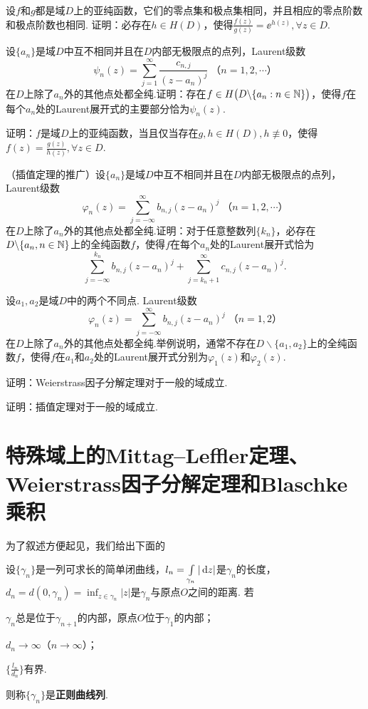 \begin{xiti}
  \item 设$f$和$g$都是域$D$上的亚纯函数，它们的零点集和极点集相同，并且相应的零点阶数和极点阶数也相同. 证明：必存在$h\in H(D)$，使得$\frac{f(z)}{g(z)}=\ee^{h(z)},\forall z\in D$.
  \item 设$\{a_n\}$是域$D$中互不相同并且在$D$内部无极限点的点列，Laurent级数
     \[
       \psi_n(z) = \sum_{j=1}^\infty\frac{c_{n,j}}{(z-a_n)^j}\;\mbox{（$n=1,2,\cdots$）}
     \]
     在$D$上除了$a_n$外的其他点处都全纯.证明：存在$f\in H\big(D\backslash
      \{a_n:n\in\mathbb N\}\big)$，使得$f$在每个$a_n$处的Laurent展开式的主要部分恰为$\psi_n(z)$.
  \item 证明：$f$是域$D$上的亚纯函数，当且仅当存在$g,h\in H(D),h\not\equiv0$，使得$f(z)=\frac{g(z)}{h(z)},\forall z\in D$.
  \item （插值定理的推广）设$\{a_n\}$是域$D$中互不相同并且在$D$内部无极限点的点列，Laurent级数
     \[
       \varphi_n(z) = \sum_{j=-\infty}^\infty b_{n,j}(z-a_n)^j\;\mbox{（$n=1,2,\cdots$）}
     \]
     在$D$上除了$a_n$外的其他点处都全纯.证明：对于任意整数列$\{k_n\}$，必存在$D\backslash
        \{a_n,n\in\mathbb N\}$上的全纯函数$f$，使得$f$在每个$a_n$处的Laurent展开式恰为
     \[
       \sum_{j=-\infty}^{k_n}b_{n,j}(z-a_n)^j+\sum_{j=k_n+1}^\infty c_{n,j}(z-a_n)^j.
     \]
  \item 设$a_1,a_2$是域$D$中的两个不同点. Laurent级数
     \[
       \varphi_n(z)=\sum_{j=-\infty}^\infty b_{n,j}(z-a_n)^j\;\mbox{（$n=1,2$）}
     \]
     在$D$上除了$a_n$外的其他点处都全纯.举例说明，通常不存在$D\backslash\{a_1,a_2\}$上的全纯函数$f$，使得$f$在$a_1$和$a_2$处的Laurent展开式分别为$\varphi_1(z)$和$\varphi_2(z)$.
  \item 证明：Weierstrass因子分解定理对于一般的域成立.
  \item 证明：插值定理对于一般的域成立.
\end{xiti}

\section{特殊域上的Mittag--Leffler定理、
Weierstrass因子分解定理和Blaschke 乘积\label{sec5.7}}
为了叙述方便起见，我们给出下面的
\begin{definition}\label{def5.7.1}
  设$\{\gamma_n\}$是一列可求长的简单闭曲线，$l_n=\int\limits_{\gamma_n}|\mathop{}\!\mathrm dz|$是$\gamma_n$的长度，$d_n=d(0,\gamma_n)=\inf_{z\in\gamma_n}|z|$是$\gamma_n$与原点$O$之间的距离. 若
  \begin{eenum}
    \item $\gamma_n$总是位于$\gamma_{n+1}$的内部，原点$O$位于$\gamma_1$的内部；
    \item $d_n\to\infty$（$n\to\infty$）；
    \item $\bigg\{\frac{l_n}{d_n}\bigg\}$有界.
  \end{eenum}
  则称$\{\gamma_n\}$是\textbf{正则曲线列}.
\end{definition}

